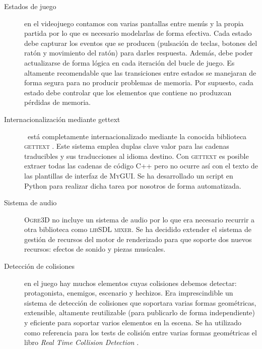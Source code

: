 \documentclass[a4paper,11pt]{article}
\begin{document}
\begin{description}
    \item [Estados de juego] en el videojuego contamos con varias pantallas
    entre menús y la propia partida por lo que es necesario modelarlas
    de forma efectiva. Cada estado debe capturar los eventos que se producen
    (pulsación de teclas, botones del ratón y movimiento del ratón) para
    darles respuesta. Además, debe poder actualizarse de forma lógica en
    cada iteración del bucle de juego. Es altamente recomendable que
    las transiciones entre estados se manejaran de forma segura para no
    producir problemas de memoria. Por supuesto, cada estado debe
    controlar que los elementos que contiene no produzcan pérdidas de memoria.\\
    
    \item [Internacionalización mediante gettext] \juego\ está completamente
    internacionalizado mediante la conocida biblioteca \textsc{gettext} \cite{pdf:jtgettext}.
    Este sistema emplea duplas clave valor para las cadenas traducibles y
    sus traducciones al idioma destino. Con \textsc{gettext} es posible
    extraer todas las cadenas de código C++ pero no ocurre así con el texto de las
    plantillas de interfaz de \textsc{MyGUI}. Se ha desarrollado
    un script en Python para realizar dicha tarea por nosotros de forma automatizada.\\
    
    \item [Sistema de audio] \textsc{Ogre3D} no incluye un sistema de audio
    por lo que era necesario recurrir a otra biblioteca como \textsc{libSDL mixer}.
    Se ha decidido extender el sistema de gestión de recursos del motor
    de renderizado para que soporte dos nuevos recursos: efectos de sonido
    y piezas musicales.\\
    
    \item [Detección de colisiones] en el juego hay muchos elementos cuyas
    colisiones debemos detectar: protagonista, enemigos, escenario y hechizos.
    Era imprescindible un sistema de detección de colisiones que soportara
    varias formas geométricas, extensible, altamente reutilizable (para publicarlo
    de forma independiente) y eficiente para soportar varios elementos
    en la escena. Se ha utilizado como referencia para los tests de colisión
    entre varias formas geométricas el libro \textit{Real Time Collision
    Detection} \cite{eric05}.\\
    

\end{description}
\end{document}
